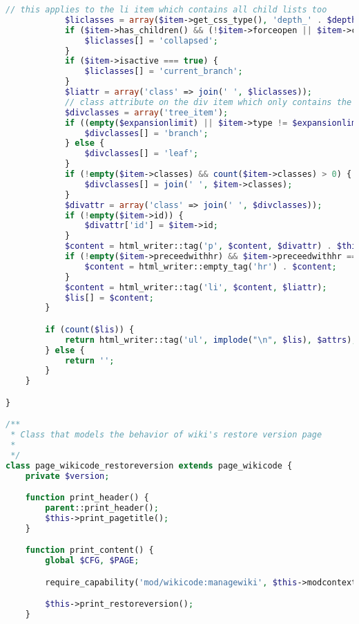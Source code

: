 \begin{lstlisting}[language=PHP]
            // this applies to the li item which contains all child lists too
            $liclasses = array($item->get_css_type(), 'depth_' . $depth);
            if ($item->has_children() && (!$item->forceopen || $item->collapse)) {
                $liclasses[] = 'collapsed';
            }
            if ($item->isactive === true) {
                $liclasses[] = 'current_branch';
            }
            $liattr = array('class' => join(' ', $liclasses));
            // class attribute on the div item which only contains the item content
            $divclasses = array('tree_item');
            if ((empty($expansionlimit) || $item->type != $expansionlimit) && ($item->children->count() > 0 || ($item->nodetype == navigation_node::NODETYPE_BRANCH && $item->children->count() == 0 && isloggedin()))) {
                $divclasses[] = 'branch';
            } else {
                $divclasses[] = 'leaf';
            }
            if (!empty($item->classes) && count($item->classes) > 0) {
                $divclasses[] = join(' ', $item->classes);
            }
            $divattr = array('class' => join(' ', $divclasses));
            if (!empty($item->id)) {
                $divattr['id'] = $item->id;
            }
            $content = html_writer::tag('p', $content, $divattr) . $this->render_navigation_node($item->children, array(), $expansionlimit, $depth + 1);
            if (!empty($item->preceedwithhr) && $item->preceedwithhr === true) {
                $content = html_writer::empty_tag('hr') . $content;
            }
            $content = html_writer::tag('li', $content, $liattr);
            $lis[] = $content;
        }

        if (count($lis)) {
            return html_writer::tag('ul', implode("\n", $lis), $attrs);
        } else {
            return '';
        }
    }

}

/**
 * Class that models the behavior of wiki's restore version page
 *
 */
class page_wikicode_restoreversion extends page_wikicode {
    private $version;

    function print_header() {
        parent::print_header();
        $this->print_pagetitle();
    }

    function print_content() {
        global $CFG, $PAGE;

        require_capability('mod/wikicode:managewiki', $this->modcontext, NULL, true, 'nomanagewikipermission', 'wikicode');

        $this->print_restoreversion();
    }


\end{lstlisting}
